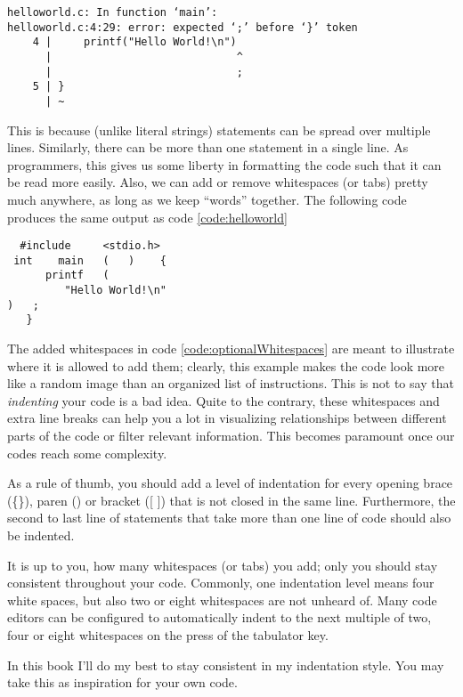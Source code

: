 \begin{cmdbox}
\begin{verbatim}
helloworld.c: In function ‘main’:
helloworld.c:4:29: error: expected ‘;’ before ‘}’ token
    4 |     printf("Hello World!\n")
      |                             ^
      |                             ;
    5 | }
      | ~
\end{verbatim}
\end{cmdbox}

This is because (unlike literal strings) statements can be spread over multiple lines. Similarly, there can be more than one statement in a single line. As programmers, this gives us some liberty in formatting the code such that it can be read more easily. Also, we can add or remove whitespaces (or tabs) pretty much anywhere, as long as we keep \enquote{words} together. The following code produces the same output as code \ref{code:helloworld}
\begin{codebox}
\begin{verbatim}
  #include     <stdio.h>
 int    main   (   )    {
      printf   (   
         "Hello World!\n"
)   ;
   }
\end{verbatim}
 \label{code:optionalWhitespaces}
\end{codebox}

\begin{hintbox}
The added whitespaces in code \ref{code:optionalWhitespaces} are meant to illustrate where it is allowed to add them; clearly, this example makes the code look more like a random image than an organized list of instructions. This is not to say that \emph{indenting} your code is a bad idea. Quite to the contrary, these whitespaces and extra line breaks can help you a lot in visualizing relationships between different parts of the code or filter relevant information. This becomes paramount once our codes reach some complexity.

As a rule of thumb, you should add a level of indentation for every opening brace (\{\}), paren () or bracket ([ ]) that is not closed in the same line. Furthermore, the second to last line of statements that take more than one line of code should also be indented.

It is up to you, how many whitespaces (or tabs) you add; only you should stay consistent throughout your code. Commonly, one indentation level means four white spaces, but also two or eight whitespaces are not unheard of. Many code editors can be configured to automatically indent to the next multiple of two, four or eight whitespaces on the press of the tabulator key.

In this book I'll do my best to stay consistent in my indentation style. You may take this as inspiration for your own code.
\end{hintbox}

